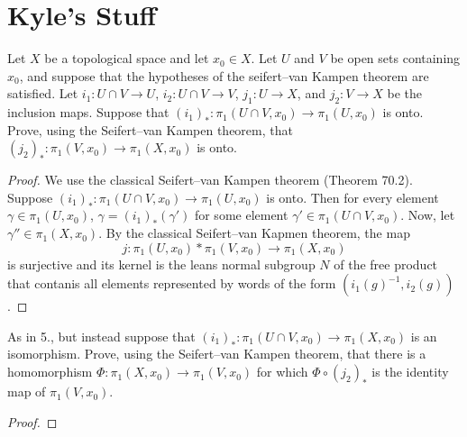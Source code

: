 \section{Kyle's Stuff}
\begin{problem}[No.\,5]
Let $X$ be a topological space and let $x_0\in X$. Let $U$ and $V$ be open
sets containing $x_0$, and suppose that the hypotheses of the seifert--van
Kampen theorem are satisfied. Let $i_1\colon U\cap V\to U$, $i_2\colon
U\cap V\to V$, $j_1\colon U\to X$, and $j_2\colon V\to X$ be the inclusion
maps. Suppose that $\left(i_1\right)_*\colon \pi_1(U\cap
V,x_0)\to\pi_1(U,x_0)$ is onto. Prove, using the Seifert--van Kampen
theorem, that $\left( j_2 \right)_*\colon\pi_1(V,x_0)\to\pi_1(X,x_0)$ is
onto.
\end{problem}
\begin{proof}
We use the classical Seifert--van Kampen theorem (Theorem 70.2). Suppose
$\left(i_1\right)_*\colon\pi_1(U\cap V,x_0)\to\pi_1(U,x_0)$ is onto. Then
for every element $\gamma\in\pi_1(U,x_0)$,
$\gamma=\left(i_1\right)_*(\gamma')$ for some element
$\gamma'\in\pi_1(U\cap V,x_0)$. Now, let $\gamma''\in\pi_1(X,x_0)$. By the
classical Seifert--van Kapmen theorem, the map
\[
j\colon\pi_1(U,x_0)*\pi_1(V,x_0)\longrightarrow\pi_1(X,x_0)
\]
is surjective and its kernel is the leans normal subgroup $N$ of the free
product that contanis all elements represented by words of the form
$(i_1(g)^{-1},i_2(g))$.
\end{proof}
\begin{problem}[No.\,6]
As in 5., but instead suppose that $\left( i_1 \right)_*\colon\pi_1(U\cap
V,x_0)\to\pi_1(X,x_0)$ is an isomorphism. Prove, using the Seifert--van
Kampen theorem, that there is a homomorphism
$\Phi\colon\pi_1(X,x_0)\to\pi_1(V,x_0)$ for which
$\Phi\circ\left(j_2\right)_*$ is the identity map of $\pi_1(V,x_0)$.
\end{problem}
\begin{proof}

\end{proof}

